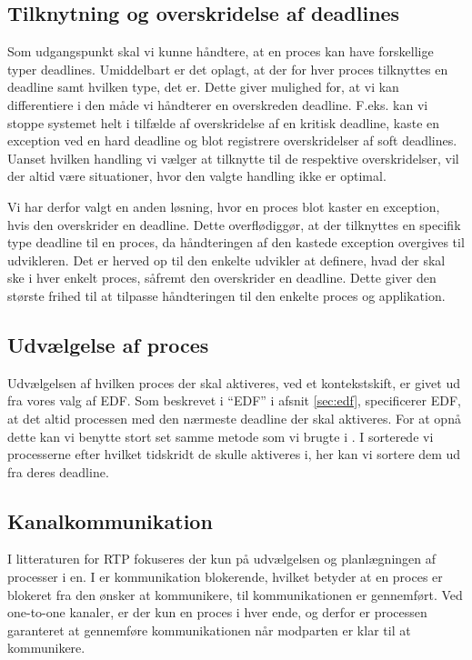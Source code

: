 \subsection{Tilknytning og overskridelse af deadlines}
Som udgangspunkt skal vi kunne håndtere, at en proces kan have forskellige typer deadlines. Umiddelbart er det oplagt, at der for hver proces tilknyttes en deadline samt hvilken type, det er. Dette giver mulighed for, at vi kan differentiere i den måde vi håndterer en overskreden deadline. F.eks. kan vi stoppe systemet helt i tilfælde af overskridelse af en kritisk deadline, kaste en exception ved en hard deadline og blot registrere overskridelser af soft deadlines. Uanset hvilken handling vi vælger at tilknytte til de respektive overskridelser, vil der altid være situationer, hvor den valgte handling ikke er optimal. 

Vi har derfor valgt en anden løsning, hvor en proces blot kaster en exception, hvis den overskrider en deadline. Dette overflødiggør, at der tilknyttes en specifik type deadline til en proces, da håndteringen af den kastede exception overgives til udvikleren. Det er herved op til den enkelte udvikler at definere, hvad der skal ske i hver enkelt proces, såfremt den overskrider en deadline. Dette giver den største frihed til at tilpasse håndteringen til den enkelte proces og applikation. 

\subsection{Udvælgelse af proces}
Udvælgelsen af hvilken proces der skal aktiveres, ved et kontekstskift, er givet ud fra vores valg af EDF. Som beskrevet i ``EDF'' i afsnit \ref{sec:edf}, specificerer EDF, at det altid processen med den nærmeste deadline der skal aktiveres. For at opnå dette kan vi benytte stort set samme metode som vi brugte i \des. I \des sorterede vi processerne efter hvilket tidskridt de skulle aktiveres i, her kan vi sortere dem ud fra deres deadline.  

\subsection{Kanalkommunikation}\label{sec:rtp-kommunikation}
I litteraturen for  RTP fokuseres der kun på udvælgelsen og planlægningen af processer i \sched en. I \pycsp er kommunikation blokerende, hvilket betyder at en proces er  blokeret fra den ønsker at kommunikere, til kommunikationen er gennemført. Ved one-to-one kanaler, er der kun en proces i hver ende, og derfor er processen garanteret at gennemføre kommunikationen når modparten er klar til at kommunikere.

